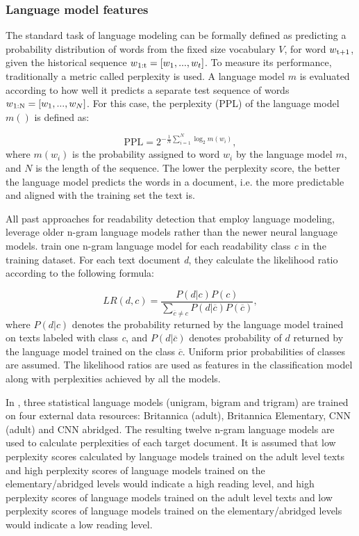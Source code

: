 \documentclass{clv3}
\begin{document}
\subsubsection{Language model features}
\label{sec:LMs}
The standard task of language modeling can be formally defined as predicting a probability distribution of words from the fixed size vocabulary $V$, for word $w\textsubscript{t+1}$, given the historical sequence $w\textsubscript{1:t} = [w_1,...,w_t]$. To measure its performance, traditionally a metric called perplexity is used. A language model $m$ is evaluated according to how well it predicts a separate test sequence of words $w\textsubscript{1:N} = [w_1,...,w_N]$. For this case, the perplexity (PPL) of the language model $m()$ is defined as:

\begin{equation}
\textrm{PPL} = 2^{-\frac{1}{N} \sum_{i=1}^{N}\log_2{m(w_{i})}},
\label{eq:PPL}
\end{equation}
\noindent 
where $m(w_{i})$ is the probability assigned to word $w_i$ by the language model $m$, and $N$ is the length of the sequence. The lower the perplexity score, the better the language model predicts the words in a document, i.e. the more predictable and aligned with the training set the text is.

All past approaches for readability detection that employ language modeling, leverage older n-gram language models rather than the newer neural language models. \citet{schwarm2005reading} train one n-gram language model for each readability class \textit{c} in the training dataset. For each text document \textit{d}, they calculate the likelihood ratio according to the following formula:

\[ LR(d,c) = \frac{P(d|c)P(c)}{\sum_{\overline{c} \neq c}^{} P(d|\overline{c})P(\overline{c})}, \] 
where $P(d|c)$ denotes the probability returned by the language model trained on texts labeled with class \textit{c}, and $P(d|\overline{c})$ denotes probability of $d$ returned by the language model trained on the class $\overline{c}$. Uniform prior probabilities of classes are assumed. The likelihood ratios are used as features in the classification model along with perplexities achieved by all the models.

In \citet{petersen2009machine}, three statistical language models (unigram, bigram and trigram) are trained on four external data resources: Britannica (adult), Britannica Elementary, CNN (adult) and CNN abridged. The resulting twelve n-gram language models are used to calculate perplexities of each target document. It is assumed that low perplexity scores calculated by language models trained on the adult level texts and high perplexity scores of language models trained on the elementary/abridged levels would indicate a high reading level, and high perplexity scores of language models trained on the adult level texts and low perplexity scores of language models trained on the elementary/abridged levels would indicate a low reading level.
\end{document}

